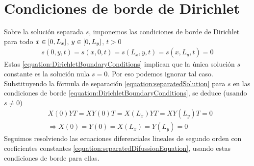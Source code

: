 \documentclass{article}
\newcommand{\leftOpenInterval}{\left]}
\newcommand{\rightOpenInterval}{\right[}
\newcommand{\leftClosedInterval}{\left[}
\newcommand{\rightClosedInterval}{\right]}
\newcommand{\interval}[3]{%
  \ifstrequal{#1}{oo}{%
    \leftOpenInterval #2, #3 \rightOpenInterval%
  }{%
    \ifstrequal{#1}{co}{%
      \leftClosedInterval #2, #3 \rightOpenInterval%
    }{%
      \ifstrequal{#1}{oc}{
        \leftOpenInterval #2, #3 \rightClosedInterval%
      }{%
        \ifstrequal{#1}{cc}{
          \leftClosedInterval #2, #3 \rightClosedInterval
        }{%
        }%
      }%
    }%
  }%
}
\begin{document}
  \section{Condiciones de borde de Dirichlet}
  Sobre la solución separada \(s\), imponemos las condiciones de borde de Dirichlet para todo \(x \in \interval{cc}{0}{L_x}\), \(y \in \interval{cc}{0}{L_y}\), \(t > 0\)
  \begin{align}
    \label{equation:DirichletBoundaryConditions}
    s(0, y , t)
    =
    s(x, 0, t)
    =
    s(L_x, y, t)
    =
    s(x, L_y, t)
    =
    0
  \end{align}
  Estas \eqref{equation:DirichletBoundaryConditions} implican que la única solución \(s\) constante es la solución nula \(s = 0\).
  Por eso podemos ignorar tal caso.
  Substituyendo la fórmula de separación \eqref{equation:separatedSolution} para \(s\) en las condiciones de borde \eqref{equation:DirichletBoundaryConditions}, se deduce (usando \(s \neq 0\))
  \begin{align}
    &X(0) Y T
    =
    X Y(0) T
    =
    X(L_x) Y T
    =
    X Y(L_y) T
    =
    0
    \\
    \label{equation:separatedInitialConditions}
    &\Rightarrow X(0) = Y(0) = X(L_x) = Y(L_y) = 0
  \end{align}
  Seguimos resolviendo las ecuaciones diferenciales lineales de segundo orden con coeficientes constantes \eqref{equation:separatedDifussionEquation}, usando estas condiciones de borde para ellas.
  
\end{document}
